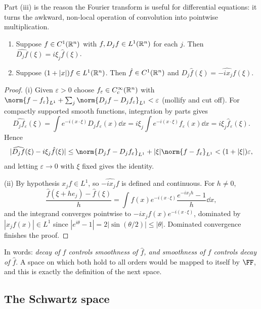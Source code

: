 \documentclass[a4paper]{scrartcl}
\begin{document}
Part (iii) is the reason the Fourier transform is useful for differential equations: it turns the awkward, non-local operation of convolution into pointwise multiplication.

\begin{theorem}\label{thm:ftderiv}
	\begin{enumerate}[label=(\roman*)]
		\item Suppose $f \in C^1(\mathbb{R}^n)$ with $f, D_jf \in L^1(\mathbb{R}^n)$ for each $j$. Then $\widehat{D_jf}(\xi) = i\xi_j \hat f(\xi)$.
		\item Suppose $(1+|x|)f \in L^1(\mathbb{R}^n)$. Then $\hat f \in C^1(\mathbb{R}^n)$ and $D_j \hat f(\xi) = \widehat{-ix_jf}(\xi)$.
	\end{enumerate}
\end{theorem}

\begin{proof}
	(i) Given $\varepsilon > 0$ choose $f_\varepsilon \in C_c^\infty(\mathbb{R}^n)$ with $\norm{f - f_\varepsilon}_{L^1}+\sum_j \norm{D_jf - D_jf_\varepsilon}_{L^1}<\varepsilon$ (mollify and cut off). For compactly supported smooth functions, integration by parts gives
	$$\widehat{D_jf_\varepsilon}(\xi) = \int e^{-i(x\cdot\xi)}D_jf_\varepsilon(x)\dd x = i\xi_j \int e^{-i(x\cdot\xi)}f_\varepsilon(x)\dd x = i\xi_j\hat f_\varepsilon(\xi).$$
	Hence
	$$|\widehat{D_jf}(\xi)-i\xi_j\hat f(\xi)| \le \norm{D_jf - D_jf_\varepsilon}_{L^1}+|\xi|\norm{f-f_\varepsilon}_{L^1}<(1+|\xi|)\varepsilon,$$
	and letting $\varepsilon \to 0$ with $\xi$ fixed gives the identity.

	(ii) By hypothesis $x_jf \in L^1$, so $\widehat{-ix_jf}$ is defined and continuous. For $h \ne 0$,
	$$\frac{\hat f(\xi+he_j)-\hat f(\xi)}{h} = \int f(x)e^{-i(x\cdot\xi)}\frac{e^{-ix_jh}-1}{h}\dd x,$$
	and the integrand converges pointwise to $-ix_jf(x)e^{-i(x\cdot\xi)}$, dominated by $|x_jf(x)| \in L^1$ since $|e^{i\theta}-1| = 2|\sin(\theta/2)|\le|\theta|$. Dominated convergence finishes the proof.
\end{proof}

In words: \emph{decay of $f$ controls smoothness of $\hat f$, and smoothness of $f$ controls decay of $\hat f$}. A space on which both hold to all orders would be mapped to itself by $\FF$, and this is exactly the definition of the next space.

\subsection{The Schwartz space}
\end{document}
